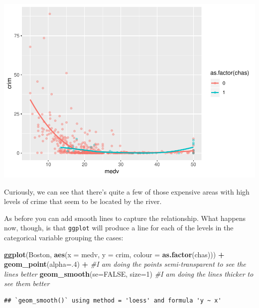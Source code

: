 \documentclass[]{book}
\newenvironment{Shaded}{\begin{snugshade}}{\end{snugshade}}
\newcommand{\CommentTok}[1]{\textcolor[rgb]{0.56,0.35,0.01}{\textit{#1}}}
\newcommand{\DataTypeTok}[1]{\textcolor[rgb]{0.13,0.29,0.53}{#1}}
\newcommand{\DecValTok}[1]{\textcolor[rgb]{0.00,0.00,0.81}{#1}}
\newcommand{\KeywordTok}[1]{\textcolor[rgb]{0.13,0.29,0.53}{\textbf{#1}}}
\newcommand{\NormalTok}[1]{#1}
\newcommand{\OperatorTok}[1]{\textcolor[rgb]{0.81,0.36,0.00}{\textbf{#1}}}
\newcommand{\OtherTok}[1]{\textcolor[rgb]{0.56,0.35,0.01}{#1}}
\newcommand{\StringTok}[1]{\textcolor[rgb]{0.31,0.60,0.02}{#1}}
\theoremstyle{definition}
\theoremstyle{definition}
\theoremstyle{definition}
\theoremstyle{remark}
\begin{document}
\includegraphics{03-visualisation_files/figure-latex/unnamed-chunk-44-1.pdf}

Curiously, we can see that there's quite a few of those expensive areas
with high levels of crime that seem to be located by the river.

As before you can add smooth lines to capture the relationship. What
happens now, though, is that \texttt{ggplot} will produce a line for
each of the levels in the categorical variable grouping the cases:

\begin{Shaded}
\begin{Highlighting}[]
\KeywordTok{ggplot}\NormalTok{(Boston, }\KeywordTok{aes}\NormalTok{(}\DataTypeTok{x =}\NormalTok{ medv, }\DataTypeTok{y =}\NormalTok{ crim, }\DataTypeTok{colour =} \KeywordTok{as.factor}\NormalTok{(chas))) }\OperatorTok{+}
\StringTok{  }\KeywordTok{geom_point}\NormalTok{(}\DataTypeTok{alpha=}\NormalTok{.}\DecValTok{4}\NormalTok{) }\OperatorTok{+}\StringTok{ }\CommentTok{#I am doing the points semi-transparent to see the lines better}
\StringTok{  }\KeywordTok{geom_smooth}\NormalTok{(}\DataTypeTok{se=}\OtherTok{FALSE}\NormalTok{, }\DataTypeTok{size=}\DecValTok{1}\NormalTok{) }\CommentTok{#I am doing the lines thicker to see them better}
\end{Highlighting}
\end{Shaded}

\begin{verbatim}
## `geom_smooth()` using method = 'loess' and formula 'y ~ x'
\end{verbatim}
\end{document}
